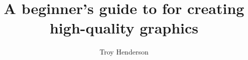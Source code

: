 \documentclass{article}
\begin{document}
\title{A beginner's guide to \MP{} for creating high-quality graphics}
\author{Troy Henderson}
\maketitle










\end{document}
